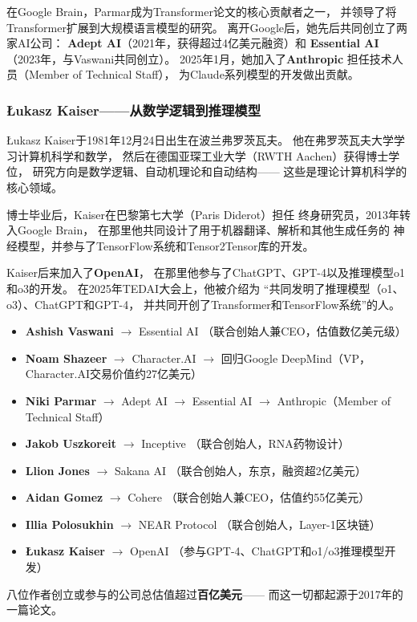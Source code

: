 在Google Brain，Parmar成为Transformer论文的核心贡献者之一，
并领导了将Transformer扩展到大规模语言模型的研究。
离开Google后，她先后共同创立了两家AI公司：
\textbf{Adept AI}（2021年，获得超过4亿美元融资）和
\textbf{Essential AI}（2023年，与Vaswani共同创立）。
2025年1月，她加入了\textbf{Anthropic}
担任技术人员（Member of Technical Staff），
为Claude系列模型的开发做出贡献。

\subsubsection{\L{}ukasz Kaiser——从数学逻辑到推理模型}
\L{}ukasz Kaiser于1981年12月24日出生在波兰弗罗茨瓦夫。
他在弗罗茨瓦夫大学学习计算机科学和数学，
然后在德国亚琛工业大学（RWTH Aachen）获得博士学位，
研究方向是数学逻辑、自动机理论和自动结构——
这些是理论计算机科学的核心领域。

博士毕业后，Kaiser在巴黎第七大学（Paris Diderot）担任
终身研究员，2013年转入Google Brain，
在那里他共同设计了用于机器翻译、解析和其他生成任务的
神经模型，并参与了TensorFlow系统和Tensor2Tensor库的开发。

Kaiser后来加入了\textbf{OpenAI}，
在那里他参与了ChatGPT、GPT-4以及推理模型o1和o3的开发。
在2025年TEDAI大会上，他被介绍为
``共同发明了推理模型（o1、o3）、ChatGPT和GPT-4，
并共同开创了Transformer和TensorFlow系统''的人。

\begin{keybox}
\begin{itemize}[noitemsep]
  \item \textbf{Ashish Vaswani} $\to$ Essential AI
    （联合创始人兼CEO，估值数亿美元级）
  \item \textbf{Noam Shazeer} $\to$ Character.AI $\to$
    回归Google DeepMind（VP，Character.AI交易价值约27亿美元）
  \item \textbf{Niki Parmar} $\to$ Adept AI $\to$ Essential AI $\to$
    Anthropic（Member of Technical Staff）
  \item \textbf{Jakob Uszkoreit} $\to$ Inceptive
    （联合创始人，RNA药物设计）
  \item \textbf{Llion Jones} $\to$ Sakana AI
    （联合创始人，东京，融资超2亿美元）
  \item \textbf{Aidan Gomez} $\to$ Cohere
    （联合创始人兼CEO，估值约55亿美元）
  \item \textbf{Illia Polosukhin} $\to$ NEAR Protocol
    （联合创始人，Layer-1区块链）
  \item \textbf{\L{}ukasz Kaiser} $\to$ OpenAI
    （参与GPT-4、ChatGPT和o1/o3推理模型开发）
\end{itemize}
八位作者创立或参与的公司总估值超过\textbf{百亿美元}——
而这一切都起源于2017年的一篇论文。
\end{keybox}


